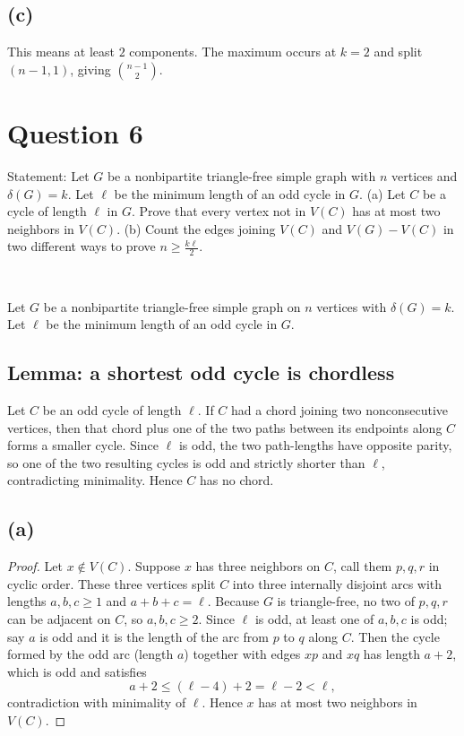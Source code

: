 \documentclass[11pt]{article}
\begin{document}
\subsection*{(c)}
This means at least $2$ components. The maximum occurs at $k=2$ and split $(n-1,1)$, giving
$\boxed{\binom{n-1}{2}}$.

\newpage

\section*{Question 6}

Statement: Let $G$ be a nonbipartite triangle-free simple graph with $n$ vertices and $\delta(G)=k$. Let $\ell$ be the minimum length of an odd cycle in $G$. (a) Let $C$ be a cycle of length $\ell$ in $G$. Prove that every vertex not in $V(C)$ has at most two neighbors in $V(C)$. (b) Count the edges joining $V (C)$ and $V (G)-V(C)$ in two different ways to prove $n \ge \frac{k\ell}{2}$.

~


Let $G$ be a nonbipartite triangle-free simple graph on $n$ vertices with $\delta(G)=k$.
Let $\ell$ be the minimum length of an odd cycle in $G$.

\subsection*{Lemma: a shortest odd cycle is chordless}
Let $C$ be an odd cycle of length $\ell$. If $C$ had a chord joining two nonconsecutive vertices,
then that chord plus one of the two paths between its endpoints along $C$ forms a smaller cycle.
Since $\ell$ is odd, the two path-lengths have opposite parity, so one of the two resulting cycles is odd
and strictly shorter than $\ell$, contradicting minimality. Hence $C$ has no chord.

\subsection*{(a)}
\begin{proof}
    Let $x\notin V(C)$. Suppose $x$ has three neighbors on $C$, call them $p,q,r$ in cyclic order.
These three vertices split $C$ into three internally disjoint arcs with lengths $a,b,c\ge 1$ and
$a+b+c=\ell$. Because $G$ is triangle-free, no two of $p,q,r$ can be adjacent on $C$, so 
$a,b,c\ge 2$. Since $\ell$ is odd, at least one of $a,b,c$ is odd; say $a$ is odd and it is the length
of the arc from $p$ to $q$ along $C$.
Then the cycle formed by the odd arc (length $a$) together with edges $xp$ and $xq$ has length $a+2$,
which is odd and satisfies
\[
a+2 \le (\ell-4)+2 = \ell-2 < \ell,
\]
contradiction with minimality of $\ell$. Hence $x$ has at most two neighbors in $V(C)$.
\end{proof}
\end{document}
